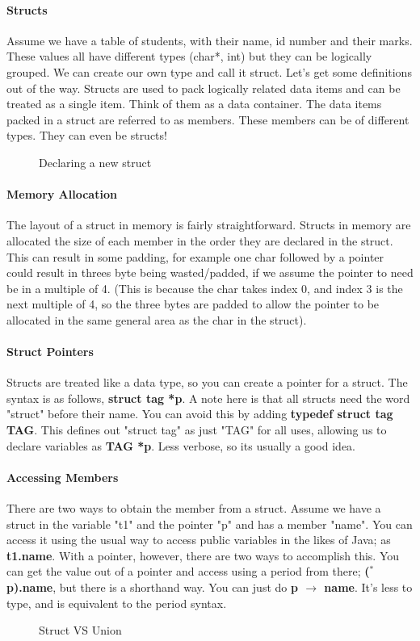 \paragraph{Structs} Assume we have a table of students, with their name, id number and their marks. These values all have different types (char*, int) but they can be logically grouped. We can create our own type and call it struct. Let's get some definitions out of the way. Structs are used to pack logically related data items and can be treated as a single item. Think of them as a data container. The data items packed in a struct are referred to as members. These members can be of different types. They can even be structs!
\begin{figure}[!htb]
	\caption{\label{fig:structdeclare} Declaring a new struct}
\end{figure}
\paragraph{Memory Allocation} The layout of a struct in memory is fairly straightforward. Structs in memory are allocated the size of each member in the order they are declared in the struct. This can result in some padding, for example one char followed by a pointer could result in threes byte being wasted/padded, if we assume the pointer to need be in a multiple of 4. (This is because the char takes index 0, and index 3 is the next multiple of 4, so the three bytes are padded to allow the pointer to be allocated in the same general area as the char in the struct).
\paragraph{Struct Pointers} Structs are treated like a data type, so you can create a pointer for a struct. The syntax is as follows, \textbf{struct tag *p}. A note here is that all structs need the word "struct" before their name. You can avoid this by adding \textbf{typedef struct tag TAG}. This defines out "struct tag" as just "TAG" for all uses, allowing us to declare variables as \textbf{TAG *p}. Less verbose, so its usually a good idea.
\paragraph{Accessing Members} There are two ways to obtain the member from a struct. Assume we have a struct in the variable "t1" and the pointer "p" and has a member "name". You can access it using the usual way to access public variables in the likes of Java; as \textbf{t1.name}. With a pointer, however, there are two ways to accomplish this. You can get the value out of a pointer and access using a period from there; \textbf{($^*$p).name}, but there is a shorthand way. You can just do \textbf{p $\rightarrow$ name}. It's less to type, and is equivalent to the period syntax.
\begin{figure}[!htb]
	\caption{\label{fig:unionstruct} Struct VS Union }
\end{figure}
